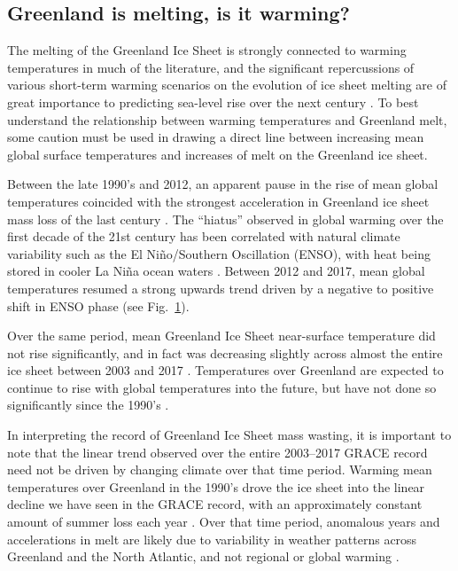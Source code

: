 \documentclass[11pt]{report}
\begin{document}
\subsection{Greenland is melting, is it warming?}
The melting of the Greenland Ice Sheet is strongly connected to warming temperatures in much of the literature, and the significant repercussions of various short-term warming scenarios on the evolution of ice sheet melting are of great importance to predicting sea-level rise over the next century \cite[][]{hahn2018,pattyn2018,ruckamp2018}. To best understand the relationship between warming temperatures and Greenland melt, some caution must be used in drawing a direct line between increasing mean global surface temperatures and increases of melt on the Greenland ice sheet. 

Between the late 1990's and 2012, an apparent pause in the rise of mean global temperatures coincided with the strongest acceleration in Greenland ice sheet mass loss of the last century \cite[][]{kosaka2013,angelen2014,bevis2018}. The ``hiatus'' observed in global warming over the first decade of the 21st century has been correlated with natural climate variability such as the El Ni\~{n}o/Southern Oscillation (ENSO), with heat being stored in cooler La Ni\~{n}a ocean waters \cite[][]{kosaka2013}. Between 2012 and 2017, mean global temperatures resumed a strong upwards trend driven by a negative to positive shift in ENSO phase (see Fig.~\ref{fig:ENSO}).

\begin{figure}[h]
\centering
{}
\caption[]{} \label{fig:ENSO}
\end{figure}

Over the same period, mean Greenland Ice Sheet near-surface temperature did not rise significantly, and in fact was decreasing slightly across almost the entire ice sheet between 2003 and 2017 \cite[see Figs.~\ref{fig:ENSO}~\&~\ref{fig:Tslope}, and ][]{hearty2018, westergaard2018,reeves2017}. Temperatures over Greenland are expected to continue to rise with global temperatures into the future, but have not done so significantly since the 1990's \cite[][]{reeves2017}. 

In interpreting the record of Greenland Ice Sheet mass wasting, it is important to note that the linear trend observed over the entire 2003--2017 GRACE record need not be driven by changing climate over that time period. Warming mean temperatures over Greenland in the 1990's drove the ice sheet into the linear decline we have seen in the GRACE record, with an approximately constant amount of summer loss each year \cite[][]{getraerFall}. Over that time period, anomalous years and accelerations in melt are likely due to variability in weather patterns across Greenland and the North Atlantic, and not regional or global warming \cite[][]{bevis2018,hahn2018}.
\end{document}
